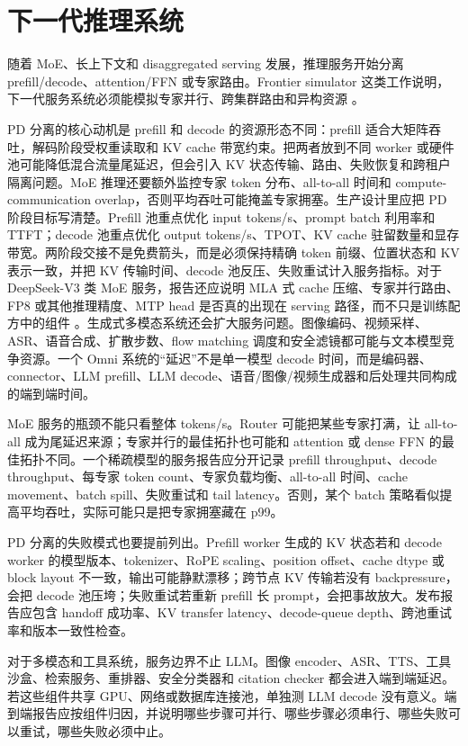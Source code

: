 \documentclass[UTF8,zihao=-4,openany]{ctexbook}
\begin{document}
\section{下一代推理系统}
随着 MoE、长上下文和 disaggregated serving 发展，推理服务开始分离 prefill/decode、attention/FFN 或专家路由。Frontier simulator 这类工作说明，下一代服务系统必须能模拟专家并行、跨集群路由和异构资源 \cite{feng2025frontier}。

PD 分离的核心动机是 prefill 和 decode 的资源形态不同：prefill 适合大矩阵吞吐，解码阶段受权重读取和 KV cache 带宽约束。把两者放到不同 worker 或硬件池可能降低混合流量尾延迟，但会引入 KV 状态传输、路由、失败恢复和跨租户隔离问题。MoE 推理还要额外监控专家 token 分布、all-to-all 时间和 compute-communication overlap，否则平均吞吐可能掩盖专家拥塞。生产设计里应把 PD 阶段目标写清楚。Prefill 池重点优化 input tokens/s、prompt batch 利用率和 TTFT；decode 池重点优化 output tokens/s、TPOT、KV cache 驻留数量和显存带宽。两阶段交接不是免费箭头，而是必须保持精确 token 前缀、位置状态和 KV 表示一致，并把 KV 传输时间、decode 池反压、失败重试计入服务指标。对于 DeepSeek-V3 类 MoE 服务，报告还应说明 MLA 式 cache 压缩、专家并行路由、FP8 或其他推理精度、MTP head 是否真的出现在 serving 路径，而不只是训练配方中的组件 \cite{deepseek2024v3}。生成式多模态系统还会扩大服务问题。图像编码、视频采样、ASR、语音合成、扩散步数、flow matching 调度和安全滤镜都可能与文本模型竞争资源。一个 Omni 系统的“延迟”不是单一模型 decode 时间，而是编码器、connector、LLM prefill、LLM decode、语音/图像/视频生成器和后处理共同构成的端到端时间。

MoE 服务的瓶颈不能只看整体 tokens/s。Router 可能把某些专家打满，让 all-to-all 成为尾延迟来源；专家并行的最佳拓扑也可能和 attention 或 dense FFN 的最佳拓扑不同。一个稀疏模型的服务报告应分开记录 prefill throughput、decode throughput、每专家 token count、专家负载均衡、all-to-all 时间、cache movement、batch spill、失败重试和 tail latency。否则，某个 batch 策略看似提高平均吞吐，实际可能只是把专家拥塞藏在 p99。

PD 分离的失败模式也要提前列出。Prefill worker 生成的 KV 状态若和 decode worker 的模型版本、tokenizer、RoPE scaling、position offset、cache dtype 或 block layout 不一致，输出可能静默漂移；跨节点 KV 传输若没有 backpressure，会把 decode 池压垮；失败重试若重新 prefill 长 prompt，会把事故放大。发布报告应包含 handoff 成功率、KV transfer latency、decode-queue depth、跨池重试率和版本一致性检查。

对于多模态和工具系统，服务边界不止 LLM。图像 encoder、ASR、TTS、工具沙盒、检索服务、重排器、安全分类器和 citation checker 都会进入端到端延迟。若这些组件共享 GPU、网络或数据库连接池，单独测 LLM decode 没有意义。端到端报告应按组件归因，并说明哪些步骤可并行、哪些步骤必须串行、哪些失败可以重试，哪些失败必须中止。
\end{document}
